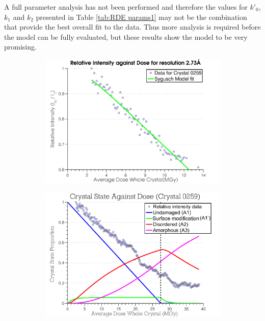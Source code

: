 A full parameter analysis has not been performed and therefore the values for $k'_0$, $k_1$ and $k_2$ presented in Table \ref{tab:RDE params1} may not be the combination that provide the best overall fit to the data.
Thus more analysis is required before the model can be fully evaluated, but these results show the model to be very promising.
\begin{figure}
        \centering
        \begin{subfigure}[b]{0.825\textwidth}
                \centering
                \includegraphics[width=\textwidth]{figures/dwd/syguschfit.pdf}
                \caption{}
                \label{figfitfial}
        \end{subfigure}
				\qquad
        \begin{subfigure}[b]{0.825\textwidth}
                \centering
                \includegraphics[width=\textwidth]{figures/dwd/crystalstates.pdf}

\end{subfigure}
\end{figure}
